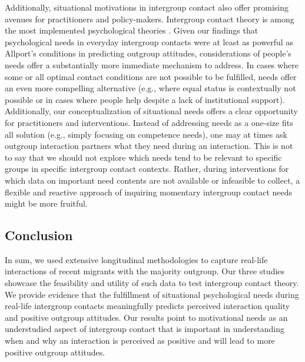 \documentclass[man, 12pt, a4paper, mask]{apa7}
\theoremstyle{break}
\theoremstyle{plain}
\begin{document}
Additionally, situational motivations in intergroup contact also offer promising avenues for practitioners and policy-makers. Intergroup contact theory is among the most implemented psychological theories \citep[e.g.,][]{Pettigrew2006, AlRamiah2012a, Reimer2021}. Given our findings that psychological needs in everyday intergroup contacts were at least as powerful as Allport's conditions in predicting outgroup attitudes, considerations of people's needs offer a substantially more immediate mechanism to address. In cases where some or all optimal contact conditions are not possible to be fulfilled, needs offer an even more compelling alternative (e.g., where equal status is contextually not possible or in cases where people help despite a lack of institutional support). Additionally, our conceptualization of situational needs offers a clear opportunity for practitioners and interventions. Instead of addressing needs as a one-size fits all solution (e.g., simply focusing on competence needs), one may at times ask outgroup interaction partners what they need during an interaction. This is not to say that we should not explore which needs tend to be relevant to specific groups in specific intergroup contact contexts. Rather, during interventions for which data on important need contents are not available or infeasible to collect, a flexible and reactive approach of inquiring momentary intergroup contact needs might be more fruitful.


\subsection{Conclusion}
In sum, we used extensive longitudinal methodologies to capture real-life interactions of recent migrants with the majority outgroup. Our three studies showcase the feasibility and utility of such data to test intergroup contact theory. We provide evidence that the fulfillment of situational psychological needs during real-life intergroup contacts meaningfully predicts perceived interaction quality and positive outgroup attitudes. Our results point to motivational needs as an understudied aspect of intergroup contact that is important in understanding when and why an interaction is perceived as positive and will lead to more positive outgroup attitudes.







\end{document}
